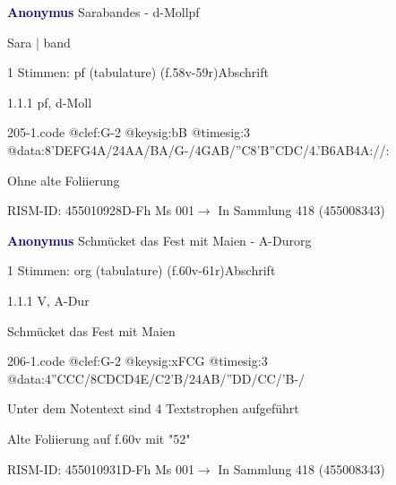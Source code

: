 \documentclass[twocolumn, 12pt]{book}
\begin{document}
\par \vspace{16pt} \textcolor{darkblue}{\textbf{Anonymus  }}\hfillplus{\textbf{[205]}}\newline Sarabandes - d-Moll\newline pf
\par \begin{itshape}[f.58v, at left:] Sara | band\end{itshape} 
\par \textcolor{darkblue}{}  1 Stimmen: pf (tabulature)  (f.58v-59r)\newline Abschrift
\par 1.1.1  pf, d-Moll  
\begin{filecontents*}{205-1.code}
@clef:G-2
@keysig:bB
@timesig:3
@data:{8'DEFG}4A/24AA/BA/G-/4GAB/''C{8'B''CDC}/4.'B{6AB}4A://:
\end{filecontents*}
\newline %
\par Ohne alte Foliierung
\par RISM-ID: 455010928\newline D-Fh  Ms 001\newline $\rightarrow$ In Sammlung 418 (455008343)
      
\par \vspace{16pt} \textcolor{darkblue}{\textbf{Anonymus  }}\hfillplus{\textbf{[206]}}\newline Schmücket das Fest mit Maien - A-Dur\newline org
\par \begin{itshape}\end{itshape} 
\par \textcolor{darkblue}{}  1 Stimmen: org (tabulature)  (f.60v-61r)\newline Abschrift
\par 1.1.1  V, A-Dur\newline \begin{footnotesize} Schmücket das Fest mit Maien \end{footnotesize}  
\begin{filecontents*}{206-1.code}
@clef:G-2
@keysig:xFCG
@timesig:3
@data:4''CCC/{8CDCD}4E/C2'B/24AB/''DD/CC/'B-/
\end{filecontents*}
\newline %
\par Unter dem Notentext sind 4 Textstrophen aufgeführt
\par Alte Foliierung auf f.60v mit "52"
\par RISM-ID: 455010931\newline D-Fh  Ms 001\newline $\rightarrow$ In Sammlung 418 (455008343)
      
\end{document}

